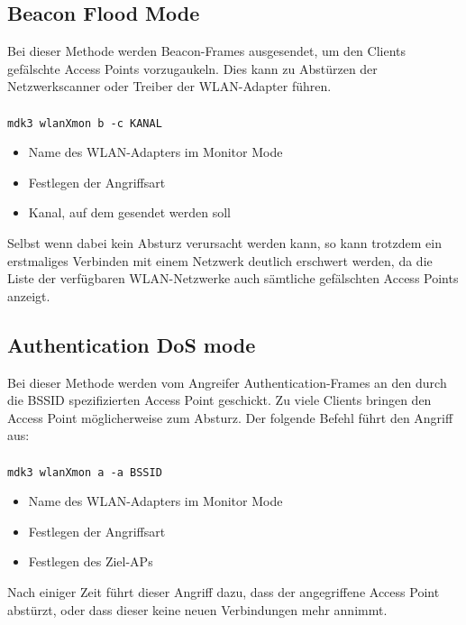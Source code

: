 \subsection{Beacon Flood Mode}
Bei dieser Methode werden Beacon-Frames ausgesendet, um den Clients gefälschte Access Points vorzugaukeln. Dies kann zu Abstürzen der Netzwerkscanner oder Treiber der WLAN-Adapter führen.\\
\\
\colorbox{altgray}{\lstinline|mdk3 wlanXmon b -c KANAL|}
\begin{itemize}
	\item {} Name des WLAN-Adapters im Monitor Mode
	\item {} Festlegen der Angriffsart
	\item {} Kanal, auf dem gesendet werden soll
\end{itemize}
Selbst wenn dabei kein Absturz verursacht werden kann, so kann trotzdem ein erstmaliges Verbinden mit einem Netzwerk deutlich erschwert werden, da die Liste der verfügbaren WLAN-Netzwerke auch sämtliche gefälschten Access Points anzeigt.

\subsection{Authentication DoS mode}
Bei dieser Methode werden vom Angreifer Authentication-Frames an den durch die BSSID spezifizierten Access Point geschickt. Zu viele Clients bringen den Access Point möglicherweise zum Absturz. Der folgende Befehl führt den Angriff aus:\\
\\
\colorbox{altgray}{\lstinline|mdk3 wlanXmon a -a BSSID|}
\begin{itemize}
	\item {} Name des WLAN-Adapters im Monitor Mode
	\item {} Festlegen der Angriffsart
	\item {} Festlegen des Ziel-APs
\end{itemize}
Nach einiger Zeit führt dieser Angriff dazu, dass der angegriffene Access Point abstürzt, oder dass dieser keine neuen Verbindungen mehr annimmt.

